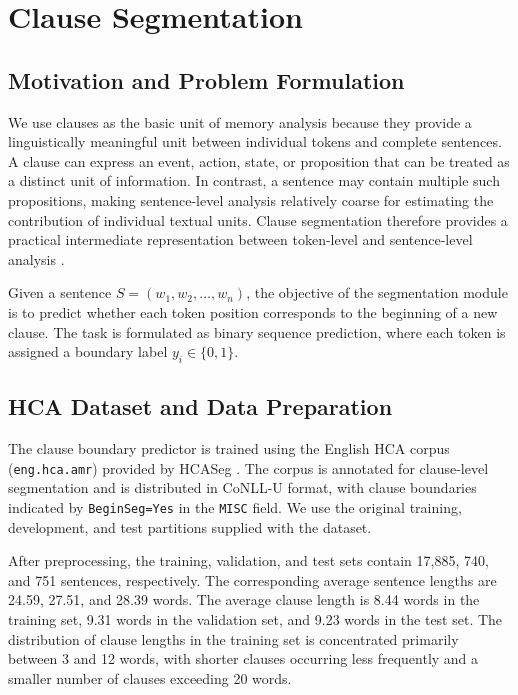 \documentclass[conference]{IEEEtran}
\begin{document}
\section{Clause Segmentation}

\subsection{Motivation and Problem Formulation}

We use clauses as the basic unit of memory analysis because they provide a linguistically meaningful unit between individual tokens and complete sentences. A clause can express an event, action, state, or proposition that can be treated as a distinct unit of information. In contrast, a sentence may contain multiple such propositions, making sentence-level analysis relatively coarse for estimating the contribution of individual textual units. Clause segmentation therefore provides a practical intermediate representation between token-level and sentence-level analysis \cite{seyfried2024}.

Given a sentence $S=(w_1,w_2,\ldots,w_n)$, the objective of the segmentation module is to predict whether each token position corresponds to the beginning of a new clause. The task is formulated as binary sequence prediction, where each token is assigned a boundary label $y_i\in\{0,1\}$.

\subsection{HCA Dataset and Data Preparation}

The clause boundary predictor is trained using the English HCA corpus (\texttt{eng.hca.amr}) provided by HCASeg \cite{yu2023}. The corpus is annotated for clause-level segmentation and is distributed in CoNLL-U format, with clause boundaries indicated by \texttt{BeginSeg=Yes} in the \texttt{MISC} field. We use the original training, development, and test partitions supplied with the dataset.

After preprocessing, the training, validation, and test sets contain 17,885, 740, and 751 sentences, respectively. The corresponding average sentence lengths are 24.59, 27.51, and 28.39 words. The average clause length is 8.44 words in the training set, 9.31 words in the validation set, and 9.23 words in the test set. The distribution of clause lengths in the training set is concentrated primarily between 3 and 12 words, with shorter clauses occurring less frequently and a smaller number of clauses exceeding 20 words.
\end{document}
